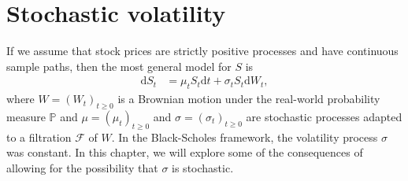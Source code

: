 \documentclass[12pt]{book}
\numberwithin{equation}{chapter}
\theoremstyle{plain}
\numberwithin{theorem}{section}
\theoremstyle{definition}
\numberwithin{exercise}{chapter}
\newcommand{\<}{\langle}
\renewcommand{\>}{\rangle}
\renewcommand{\(}{\left(}
\renewcommand{\)}{\right)}
\renewcommand{\[}{\left[}
\renewcommand{\]}{\right]}
\newcommand\Pb{\mathds{P}}
\newcommand\Fc{\mathscr{F}}
\newcommand\sig{\sigma}
\newcommand\dd{\mathrm{d}}
\theoremstyle{definition}
\numberwithin{question}{section}
\begin{document}



\chapter{Stochastic volatility}
If we assume that stock prices are strictly positive processes and have continuous sample paths, then the most general model for $S$ is
\begin{align}
\dd S_t
	&=	\mu_t S_t \dd t + \sig_t S_t \dd W_t , \label{eq:S-general}
\end{align}
where $W=(W_t)_{t \geq 0}$ is a Brownian motion under the real-world probability measure $\Pb$ and $\mu=(\mu_t)_{t \geq 0}$ and $\sig=(\sig_t)_{t \geq 0}$ are stochastic processes adapted to a filtration $\Fc$ of $W$.  In the Black-Scholes framework, the volatility process $\sig$ was constant.  In this chapter, we will explore some of the consequences of allowing for the possibility that $\sig$ is stochastic.
\end{document}
